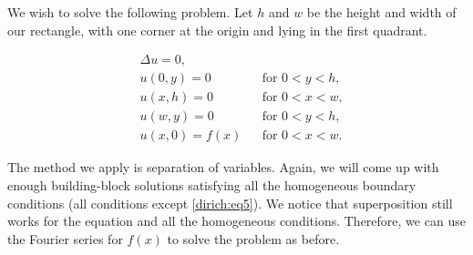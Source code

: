 \documentclass{ximera}
\begin{document}
We wish to solve the following problem.  Let $h$ and $w$ be the height and width of our rectangle, with one corner at the origin and lying in the first quadrant.


\begin{center}
    \begin{minipage}[b]{2.8in}
        \vspace{\fill}
        \begin{align}
            & \Delta u = 0 , & &  \label{dirich:eq1} \\
            & u(0,y) = 0 & & \text{for }  0 < y < h,\label{dirich:eq2} \\
            & u(x,h) = 0 & & \text{for }  0 < x < w,\label{dirich:eq3} \\
            & u(w,y) = 0 & & \text{for }  0 < y < h,\label{dirich:eq4} \\
            & u(x,0) = f(x) & & \text{for }  0 < x < w.\label{dirich:eq5}
        \end{align}
        \vspace{\fill}
    \end{minipage}
    \qquad
    
    \qquad
\end{center}

The method we apply is separation of variables.  Again, we will come up with enough building-block solutions satisfying all the homogeneous boundary conditions (all conditions except \eqref{dirich:eq5}).  We notice that superposition still works for the equation and all the homogeneous conditions. Therefore, we can use the Fourier series for $f(x)$ to solve the problem as before.
\end{document}
